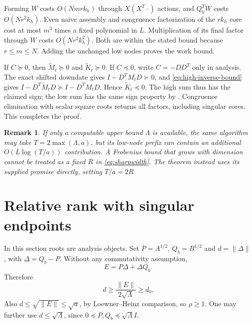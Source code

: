 \documentclass[11pt]{article}
\newtheorem{remark}[theorem]{Remark}
\numberwithin{equation}{section}
\begin{document}
Forming $W$ costs $O(Nmrk_h)$ through $X(X^T\cdot)$ actions, and
$Q_0^TW$ costs $O(Nr^2k_h)$. Even naive assembly and congruence
factorization of the $rk_h$ core cost at most $m^3$ times a fixed
polynomial in $L$. Multiplication of its final factor through $W$
costs $O(Nr^2k_h^2)$. Both are within the stated bound because
$r\le m\le N$. Adding the unchanged low nodes proves the work bound.

If $C\succeq0$, then $\widetilde M_t\succeq0$ and
$\widetilde K_t\succeq0$. If $C\preceq0$, write $C=-DD^T$
only in analysis. The exact shifted downdate gives
$I-D^TM_tD\succ0$, and \eqref{eq:high-inverse-bound} gives
$I-D^T\widetilde M_tD\succeq I-D^TM_tD$. Hence
$\widetilde K_t\preceq0$. The high sum thus has the claimed sign;
the low sum has the same sign property by \cite[Section~6]{Raw}.
Congruence elimination with scalar square roots returns all factors,
including singular cores. This completes the proof.

\begin{remark}
If only a computable upper bound $\Lambda$ is available, the same
algorithm may take $T=2\max(\Lambda,a)$, but its low-node prefix can
contain an additional $O(L\log(T/a))$ contribution. A Frobenius bound
that grows with dimension cannot be treated as a fixed $R$ in
\eqref{eq:sharpwidth}. The theorem instead uses its supplied promise
directly, setting $T/a=2R$.
\end{remark}

\section{Relative rank with singular endpoints}

In this section roots are analysis objects. Set
$P=A^{1/2}$, $Q_b=B^{1/2}$ and $d=\|\Delta\|$, with
$\Delta=Q_b-P$. Without any commutativity assumption,
\begin{equation}\label{eq:sylvester}
 E=P\Delta+\Delta Q_b.
\end{equation}
Therefore
\begin{equation}\label{eq:relative-lower}
 d\ge\frac{\|E\|}{2\sqrt\Lambda}\ge d_0.
\end{equation}
Also $d\le\sqrt{\|E\|}\le\sqrt a$, by Loewner--Heinz comparison,
so $\rho\ge1$. One may further use $d\le\sqrt\Lambda$, since
$0\preceq P,Q_b\preceq\sqrt\Lambda I$.
\end{document}
